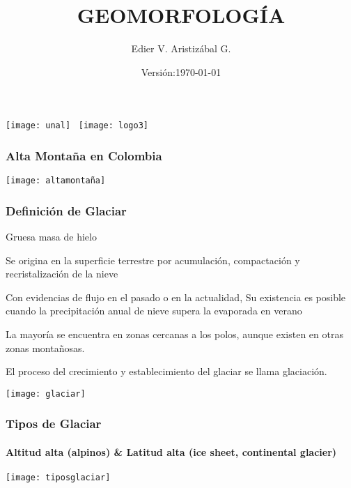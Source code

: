 \documentclass{beamer}
\title[Ambiente Glacial]{GEOMORFOLOGÍA}
\author[Edier Aristizabal]{Edier V. Aristizábal G.}
\institute{evaristizabalg@unal.edu.co}
\date{Versión:\today}
\begin{document}
\begin{frame}
\titlepage
\centering
	\texttt{[image: unal]}\hspace*{4.75cm}~%
   	\texttt{[image: logo3]} 
\end{frame}
\begin{frame}
\frametitle{Alta Montaña en Colombia}
\begin{center}
\texttt{[image: altamontaña]}
\end{center}
\end{frame}
\begin{frame}
\frametitle{Definición de Glaciar}
\begin{itemize}
\small{
\item Gruesa masa de hielo
\item Se origina en la superficie terrestre por acumulación, compactación y recristalización de la nieve
\item Con evidencias de flujo en el pasado o en la actualidad,
Su existencia es posible cuando la precipitación anual de nieve supera la evaporada en verano
\item La mayoría se encuentra en zonas cercanas a los polos, aunque existen en otras zonas montañosas.
\item El proceso del crecimiento y establecimiento del glaciar se llama glaciación.
}
\end{itemize}
\begin{center}
\texttt{[image: glaciar]}
\end{center}
\end{frame}
\begin{frame}
\frametitle{Tipos de Glaciar}
\framesubtitle{Altitud alta (alpinos) \& Latitud alta (ice sheet, continental glacier)}
\begin{center}
\texttt{[image: tiposglaciar]}
\end{center}
\end{frame}
\end{document}
